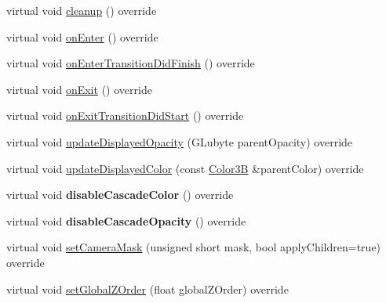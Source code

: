 \begin{DoxyCompactItemize}
\item 
virtual void \hyperlink{classProtectedNode_a6eda3b644eb5be15fe5c717c48d25634}{cleanup} () override
\item 
virtual void \hyperlink{classProtectedNode_a3f321c087261805fe0ca95fe71109b41}{on\+Enter} () override
\item 
virtual void \hyperlink{classProtectedNode_aac8fcdaf79295aa56c9b792d2e4135d6}{on\+Enter\+Transition\+Did\+Finish} () override
\item 
virtual void \hyperlink{classProtectedNode_a9f3d5d68659c662187089b18cc2dbda3}{on\+Exit} () override
\item 
virtual void \hyperlink{classProtectedNode_a3efa91524a31d8f0919be2db8af1ddc9}{on\+Exit\+Transition\+Did\+Start} () override
\item 
virtual void \hyperlink{classProtectedNode_aef8f27d6204a82d0ed5372e9082d12ae}{update\+Displayed\+Opacity} (G\+Lubyte parent\+Opacity) override
\item 
virtual void \hyperlink{classProtectedNode_ab628cf3ac452302f0c653600bb145b49}{update\+Displayed\+Color} (const \hyperlink{structColor3B}{Color3B} \&parent\+Color) override
\item 
\mbox{\label{classProtectedNode_ac0417d9477230ed656705a6079adfc88}} 
virtual void {\bfseries disable\+Cascade\+Color} () override
\item 
\mbox{\label{classProtectedNode_a71330ab5ee5157432fe84c72312b7af3}} 
virtual void {\bfseries disable\+Cascade\+Opacity} () override
\item 
virtual void \hyperlink{classProtectedNode_ad259bd1bedc5f273b3850c74dc58c2f2}{set\+Camera\+Mask} (unsigned short mask, bool apply\+Children=true) override
\item 
virtual void \hyperlink{classProtectedNode_a0d067b9056a934255c7a44a675dc9e92}{set\+Global\+Z\+Order} (float global\+Z\+Order) override
\end{DoxyCompactItemize}
